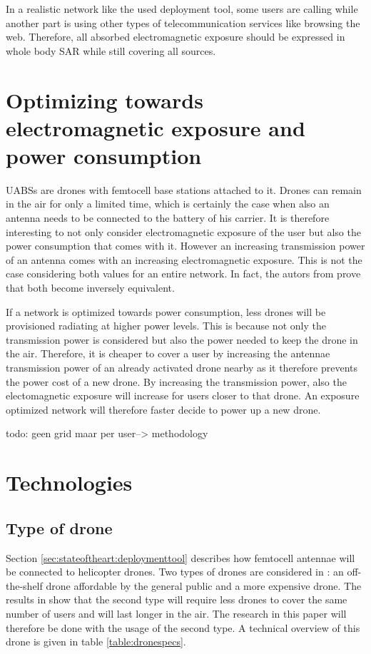 In a realistic network like the used deployment tool, some users are calling while another part is using other types of telecommunication services like browsing the web.
Therefore, all absorbed electromagnetic exposure should be expressed in whole body SAR while still covering all sources.

\section{Optimizing towards electromagnetic exposure and power consumption}
\gls{UABS}s are drones with femtocell base stations attached to it. Drones can remain in the air for only a limited time, which is certainly 
the case when also an antenna needs to be connected to the battery of his carrier. It is therefore
interesting to not only consider electromagnetic exposure of the user but also the power consumption that comes with it. 
However an increasing transmission power of an antenna comes with an increasing electromagnetic exposure. This is not the case considering
both values for an entire network. In fact, the autors from \cite{J1}  prove that both become inversely equivalent.

If a network is optimized towards power consumption, less drones will be provisioned radiating at higher power levels. This is because not only 
the transmission power is considered but also the power needed to keep the drone in the air. Therefore, it is cheaper to cover a user by 
increasing the antennae transmission power of an already activated drone nearby as it therefore prevents the power cost of a new drone.
By increasing the transmission power, also the electomagnetic exposure will increase for users closer to that drone. An exposure optimized
network will therefore faster decide to power up a new drone.

todo: geen grid maar per user--> methodology

\section{Technologies}
\subsection{Type of drone}

Section \ref{sec:stateoftheart:deploymenttool} describes how femtocell antennae will be connected to helicopter drones. Two types of 
drones are considered in \cite{J2}: an off-the-shelf drone affordable by the general public and a more expensive drone. The results in \cite{J2}
show that the second type will require less drones to cover the same number of users and will last longer in the air. The research in this paper
will therefore be done with the usage of the second type. A technical overview of this drone is given in table \ref{table:dronespecs}.


